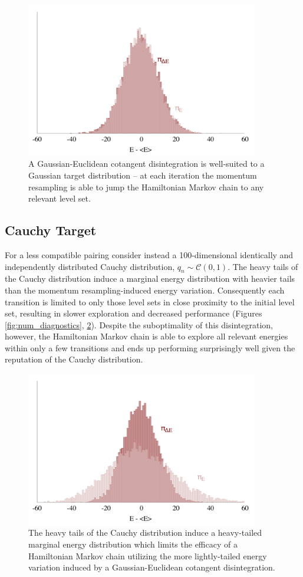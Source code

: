 \documentclass[stslayout]{imsart}
\begin{document}
\begin{figure}
\centering
\includegraphics[width=4in]{energy_gauss.pdf}
\caption{A Gaussian-Euclidean cotangent disintegration is well-suited
to a Gaussian target distribution -- at each iteration the momentum
resampling is able to jump the Hamiltonian Markov chain to any relevant
level set.}
\label{fig:gauss_exp}
\end{figure}

\subsection{Cauchy Target}

For a less compatible pairing consider instead a 100-dimensional identically 
and independently distributed Cauchy distribution, 
$q_{n} \sim \mathcal{C} \! \left( 0, 1 \right)$.  The heavy tails of the Cauchy
distribution induce a marginal energy distribution with heavier tails than
the momentum resampling-induced energy variation.  Consequently each 
transition is limited to only those level sets in close proximity to the initial 
level set, resulting in slower exploration and decreased performance 
(Figures \ref{fig:num_diagnostics}, \ref{fig:cauchy_exp}).  Despite the 
suboptimality of this disintegration, however, the Hamiltonian Markov chain 
is able to explore all relevant energies within only a few transitions and 
ends up performing surprisingly well given the reputation of the Cauchy 
distribution.

\begin{figure}
\centering
\includegraphics[width=4in]{energy_cauchy.pdf}
\caption{The heavy tails of the Cauchy distribution induce a heavy-tailed
marginal energy distribution which limits the efficacy of a Hamiltonian 
Markov chain utilizing the more lightly-tailed energy variation induced by a 
Gaussian-Euclidean cotangent disintegration.}
\label{fig:cauchy_exp}
\end{figure}
\end{document}
